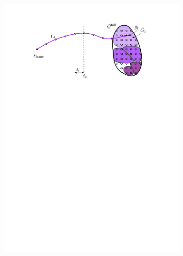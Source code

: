 \documentclass[conference]{IEEEtran}
\begin{document}
\begin{figure}[t]
\begin{subfigure}{0.225\textwidth}
        \includegraphics[width=\textwidth]{3_preprocess_loop_5}
        \caption{}
        \label{fig:pl5}
    \end{subfigure}
    \hspace{1mm}
    \begin{subfigure}{0.225\textwidth}

\end{subfigure}
\end{figure}
\end{document}

